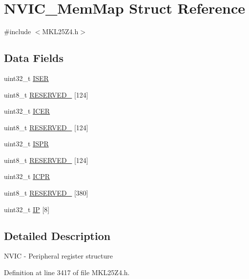 \hypertarget{struct_n_v_i_c___mem_map}{}\section{N\+V\+I\+C\+\_\+\+Mem\+Map Struct Reference}
\label{struct_n_v_i_c___mem_map}


{\ttfamily \#include $<$M\+K\+L25\+Z4.\+h$>$}

\subsection*{Data Fields}
\begin{DoxyCompactItemize}
\item 
uint32\+\_\+t \hyperlink{struct_n_v_i_c___mem_map_aaa8fb79136e7f528c4644ca658d637e8}{I\+S\+ER}
\item 
uint8\+\_\+t \hyperlink{struct_n_v_i_c___mem_map_a69ae64c8f8f5a0fb7acb96ef4918cba2}{R\+E\+S\+E\+R\+V\+E\+D\+\_} \mbox{[}124\mbox{]}
\item 
uint32\+\_\+t \hyperlink{struct_n_v_i_c___mem_map_a0def6b0bebb3e2e35a180f31f74baef8}{I\+C\+ER}
\item 
uint8\+\_\+t \hyperlink{struct_n_v_i_c___mem_map_a334ef1820658212f8a0eac5e7a6f849c}{R\+E\+S\+E\+R\+V\+E\+D\+\_} \mbox{[}124\mbox{]}
\item 
uint32\+\_\+t \hyperlink{struct_n_v_i_c___mem_map_a91ab049ba145735fc8d9319f3b0f0cb4}{I\+S\+PR}
\item 
uint8\+\_\+t \hyperlink{struct_n_v_i_c___mem_map_a0ee42a0628832413d90ff77b050481f7}{R\+E\+S\+E\+R\+V\+E\+D\+\_} \mbox{[}124\mbox{]}
\item 
uint32\+\_\+t \hyperlink{struct_n_v_i_c___mem_map_a47b16d0ffa924a50639a73c0494913b0}{I\+C\+PR}
\item 
uint8\+\_\+t \hyperlink{struct_n_v_i_c___mem_map_ae5a29589e415fd83c840ca9b764be2d3}{R\+E\+S\+E\+R\+V\+E\+D\+\_} \mbox{[}380\mbox{]}
\item 
uint32\+\_\+t \hyperlink{struct_n_v_i_c___mem_map_a4dae41a548b9558e16c2280c8695a6f8}{IP} \mbox{[}8\mbox{]}
\end{DoxyCompactItemize}


\subsection{Detailed Description}
N\+V\+IC -\/ Peripheral register structure 

Definition at line 3417 of file M\+K\+L25\+Z4.\+h.



